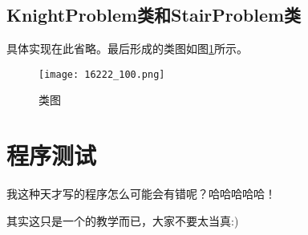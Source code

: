 \documentclass{article}
\begin{document}
\subsection{KnightProblem类和StairProblem类}

具体实现在此省略。最后形成的类图如图\ref{fig:figure1}所示。

\begin{figure}[htbp]
	\centering
	\texttt{[image: 16222\_100.png]}
	\caption{类图}
	\label{fig:figure1}
\end{figure}

\section{程序测试}
我这种天才写的程序怎么可能会有错呢？哈哈哈哈哈！

其实这只是一个\XeTeX 的教学而已，大家不要太当真:)
\end{document}
